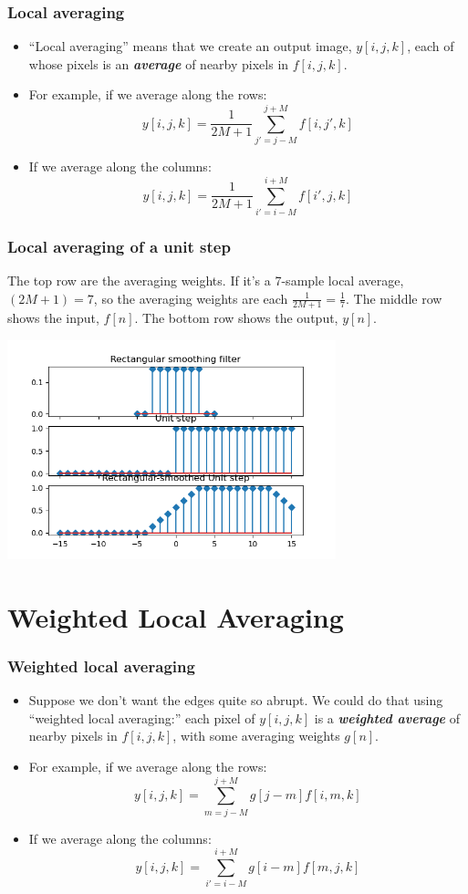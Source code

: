 \documentclass{beamer}
\begin{document}
\begin{frame}
  \frametitle{Local averaging}

  \begin{itemize}
    \item 
      ``Local averaging'' means that we create an output image,
      $y[i,j,k]$, each of whose pixels is an {\bf\em average} of nearby
      pixels in $f[i,j,k]$.
    \item
      For example, if we average along the rows:
      \[
      y[i,j,k] = \frac{1}{2M+1}\sum_{j'=j-M}^{j+M} f[i,j',k]
      \]
    \item
      If we average along the columns:
      \[
      y[i,j,k] = \frac{1}{2M+1}\sum_{i'=i-M}^{i+M} f[i',j,k]
      \]
  \end{itemize}
\end{frame}

\begin{frame}
  \frametitle{Local averaging of a unit step}
  The top row are the
  averaging weights.  If it's a 7-sample local average, $(2M+1)=7$, so
  the averaging weights are each $\frac{1}{2M+1}=\frac{1}{7}$.  The
  middle row shows the input, $f[n]$.  The bottom row shows the
  output, $y[n]$.
  \centerline{\includegraphics[height=2.5in]{mp3fig2.png}}
\end{frame}

\section[Weighted]{Weighted Local Averaging}
\setcounter{subsection}{1}

\begin{frame}
  \frametitle{Weighted local averaging}

  \begin{itemize}
    \item 
      Suppose we don't want the edges quite so abrupt.  We could do
      that using ``weighted local averaging:'' each pixel of
      $y[i,j,k]$ is a {\bf\em weighted average} of nearby pixels in
      $f[i,j,k]$, with some averaging weights $g[n]$.
    \item
      For example, if we average along the rows:
      \[
      y[i,j,k] = \sum_{m=j-M}^{j+M} g[j-m] f[i,m,k]
      \]
    \item
      If we average along the columns:
      \[
      y[i,j,k] = \sum_{i'=i-M}^{i+M} g[i-m] f[m,j,k]
      \]
  \end{itemize}
\end{frame}
\end{document}
